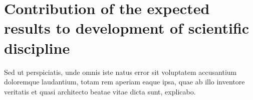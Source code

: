 \section{Contribution of the expected results to development of scientific discipline}


Sed ut perspiciatis, unde omnis iste natus error sit voluptatem accusantium doloremque laudantium, totam rem aperiam eaque ipsa, quae ab illo inventore veritatis et quasi architecto beatae vitae dicta sunt, explicabo.
